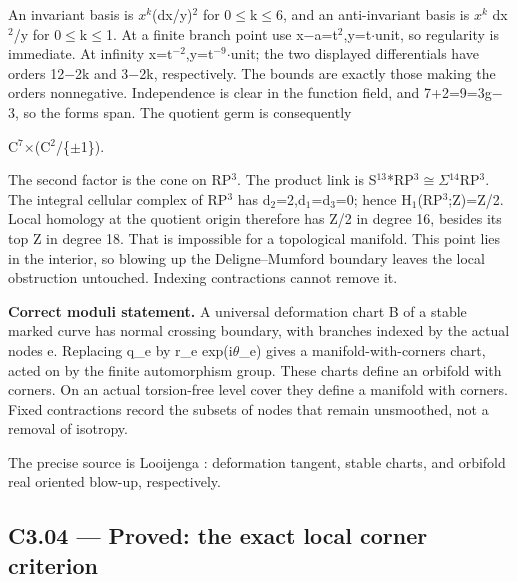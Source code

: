 An invariant basis is \(x^k\)(dx/y)\ensuremath{{}^{2}} for 0\ensuremath{\le}k\ensuremath{\le}6, and an anti-invariant basis is \(x^k\) dx\ensuremath{{}^{2}}/y for 0\ensuremath{\le}k\ensuremath{\le}1. At a finite branch point use x\ensuremath{-}a=t\ensuremath{{}^{2}},y=t\ensuremath{\cdot}unit, so regularity is immediate. At infinity x=t\ensuremath{{}^{-2}},y=t\ensuremath{{}^{-9}}\ensuremath{\cdot}unit; the two displayed differentials have orders 12\ensuremath{-}2k and 3\ensuremath{-}2k, respectively. The bounds are exactly those making the orders nonnegative. Independence is clear in the function field, and 7+2=9=3g\ensuremath{-}3, so the forms span. The quotient germ is consequently

C\ensuremath{{}^{7}}\ensuremath{\times}(C\ensuremath{{}^{2}}/\{\ensuremath{\pm}1\}).

The second factor is the cone on RP\ensuremath{{}^{3}}. The product link is S\ensuremath{{}^{13}}*RP\ensuremath{{}^{3}}\ensuremath{\cong}\ensuremath{\Sigma}\ensuremath{{}^{14}}RP\ensuremath{{}^{3}}. The integral cellular complex of RP\ensuremath{{}^{3}} has d\ensuremath{{}_{2}}=2,d\ensuremath{{}_{1}}=d\ensuremath{{}_{3}}=0; hence H\ensuremath{{}_{1}}(RP\ensuremath{{}^{3}};Z)=Z/2. Local homology at the quotient origin therefore has Z/2 in degree 16, besides its top Z in degree 18. That is impossible for a topological manifold. This point lies in the interior, so blowing up the Deligne--Mumford boundary leaves the local obstruction untouched. Indexing contractions cannot remove it.

\textbf{Correct moduli statement.} A universal deformation chart B of a stable marked curve has normal crossing boundary, with branches indexed by the actual nodes e. Replacing q\_e by r\_e exp(i\ensuremath{\theta}\_e) gives a manifold-with-corners chart, acted on by the finite automorphism group. These charts define an orbifold with corners. On an actual torsion-free level cover they define a manifold with corners. Fixed contractions record the subsets of nodes that remain unsmoothed, not a removal of isotropy.

The precise source is Looijenga \cite[Theorems 8.11 and 9.13; Proposition 9.16]{C_Looijenga}: deformation tangent, stable charts, and orbifold real oriented blow-up, respectively.

\subsection{C3.04 --- Proved: the exact local corner criterion}\label{c3.04-proved-the-exact-local-corner-criterion}

